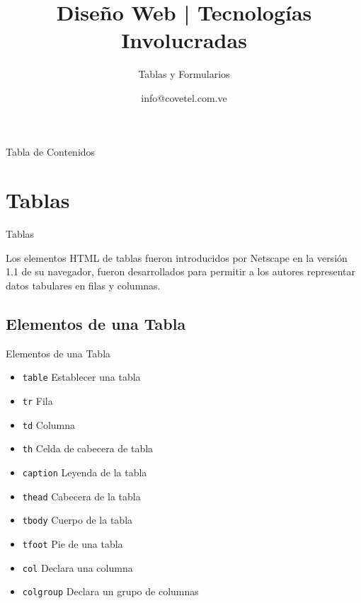 \documentclass{beamer}
\title[WebDesign] {Diseño Web | Tecnologías Involucradas}
\author[Walter Vargas]{ info@covetel.com.ve \inst{1}}
\subtitle{Tablas y Formularios}
\institute[covetel.com.ve]{ \inst{1} Cooperativa Venezolana de Tecnologías Libres R.S. }
\date
\begin{document}
\begin{frame}{Tabla de Contenidos} %
\tableofcontents
\end{frame}

\begin{frame}
  \titlepage
\end{frame}

\section{Tablas}

\begin{frame}{Tablas} %
\begin{center}
    Los elementos HTML de tablas fueron introducidos por Netscape en la versión
    1.1 de su navegador, fueron desarrollados para permitir a los autores
    representar datos tabulares en filas y columnas.
\end{center}
\end{frame}

\subsection{Elementos de una Tabla} %
\label{sub:Elementos de una Tabla}


\begin{frame}{Elementos de una Tabla} %
    \begin{center}
        \begin{itemize}
            \item \texttt{table} Establecer una tabla
            \item \texttt{tr} Fila
            \item \texttt{td} Columna
            \item \texttt{th} Celda de cabecera de tabla 
            \item \texttt{caption} Leyenda de la tabla
            \item \texttt{thead} Cabecera de la tabla
            \item \texttt{tbody} Cuerpo de la tabla 
            \item \texttt{tfoot} Pie de una tabla 
            \item \texttt{col} Declara una columna
            \item \texttt{colgroup} Declara un grupo de columnas 
           
        \end{itemize}
    \end{center}
\end{frame}
\end{document}
